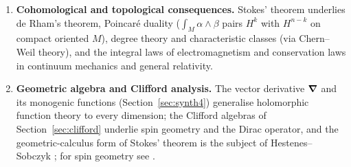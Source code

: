 \begin{enumerate}
\item \textbf{Cohomological and topological consequences.} Stokes' theorem underlies de Rham's theorem, Poincar\'e duality ($\int_M\alpha\wedge\beta$ pairs $H^k$ with $H^{n-k}$ on compact oriented $M$), degree theory and characteristic classes (via Chern--Weil theory), and the integral laws of electromagnetism and conservation laws in continuum mechanics and general relativity.
\item \textbf{Geometric algebra and Clifford analysis.} The vector derivative $\boldsymbol{\nabla}$ and its monogenic functions (Section~\ref{sec:synth4}) generalise holomorphic function theory to every dimension; the Clifford algebras of Section~\ref{sec:clifford} underlie spin geometry and the Dirac operator, and the geometric-calculus form of Stokes' theorem is the subject of Hestenes--Sobczyk \cite{HS}; for spin geometry see \cite{LM}.
\end{enumerate}
